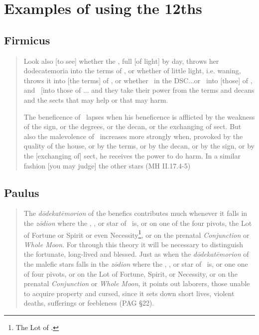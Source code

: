 \section{Examples of using the 12ths}
\subsection{Firmicus}
\begin{quote}
Look also [to see] whether the \Moon, full [of light] by day, throws her dodecatemoria into the terms of \Mars, or whether of little light, i.e. waning, throws it into [the terms] of \Saturn, or whether \Mars\, in the DSC...or \Venus\, into [those] of \Mars, and \Mars\, [into those of \Venus... and they take their power from the terms and decans and the sects that may help or that may harm.

The beneficence of \Jupiter\, lapses when his beneficence is afflicted by the weakness of the sign, or the degrees, or the decan, or the exchanging of sect. But also the malevolence of \Saturn\, increases more strongly when, provoked by the quality of the house, or by the terms, or by the decan, or by the sign, or by the [exchanging of] sect, he receives the power to do harm. In a similar fashion [you may judge] the other stars (MH II.17.4-5)
\end{quote}

\subsection{Paulus}
\begin{quote}
The \textsl{d\=odekat\=emorion} of the benefics contributes much whenever it falls in the \textsl{z\=odion} where the \Sun, \Moon, or star of \Mercury\, is, or on one of the four pivots, the Lot of Fortune or Spirit or even Necessity\footnote{The Lot of \Mercury.}, or on the prenatal \textsl{Conjunction} or \textsl{Whole Moon}. For through this theory it will be necessary to distinguish the fortunate, long-lived and blessed. Just as when the \textsl{d\=odekat\=emorion} of the malefic stars falls in the \textsl{z\=odion} where the \Sun, \Moon, or star of \Mercury\, is, or one one of four pivots, or on the Lot of Fortune, Spirit, or Necessity, or on the prenatal \textsl{Conjunction} or \textsl{Whole Moon}, it points out laborers, those unable to acquire property and cursed, since it sets down short lives, violent deaths, sufferings or feebleness (PAG \S22).
\end{quote}

